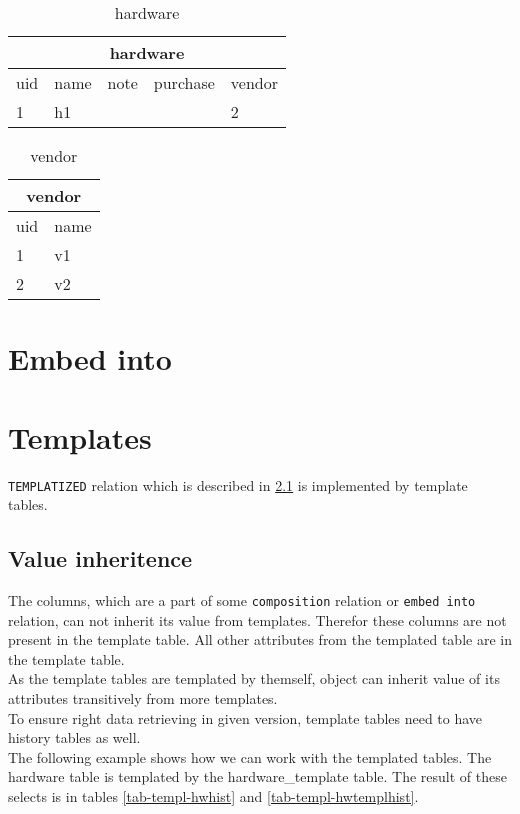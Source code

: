 \documentclass[deska]{subfiles}
\begin{document}
\begin{center}

\begin{table}
    \caption{hardware}
    \label{tab-refs-hardware}
\begin{tabular}{ | l | l | l | l | l |}
    \hline
    \multicolumn{5}{|c|}{hardware}\\
    \hline
    uid & name & note & purchase & vendor\\
    \hline
    1 & h1 &  &  & 2\\
    \hline
\end{tabular}
\end{table}

\begin{table}
    \caption{vendor}
    \label{tab-refs-vendor}
\begin{tabular}{ | l | l |}
    \hline
    \multicolumn{2}{|c|}{vendor}\\
    \hline
    uid & name \\
    \hline
    1 & v1\\
    2 & v2\\
    \hline
\end{tabular}
\end{table}

\end{center}

\section{Embed into}

\section{Templates}
{\tt TEMPLATIZED} relation which is described in \ref{} is implemented by template tables. 

\subsection{Value inheritence}
The columns, which are a part of some {\tt composition} relation or {\tt embed into} relation, can not inherit its value from templates. Therefor these columns are not present in the template table. All other attributes from the templated table are in the template table.\\
As the template tables are templated by themself, object can inherit value of its attributes transitively from more templates.\\
To ensure right data retrieving in given version, template tables need to have history tables as well.\\
The following example shows how we can work with the templated tables. The hardware table is templated by the hardware\_template table. The result of these selects is in tables \ref{tab-templ-hwhist} and \ref{tab-templ-hwtemplhist}.
\end{document}
